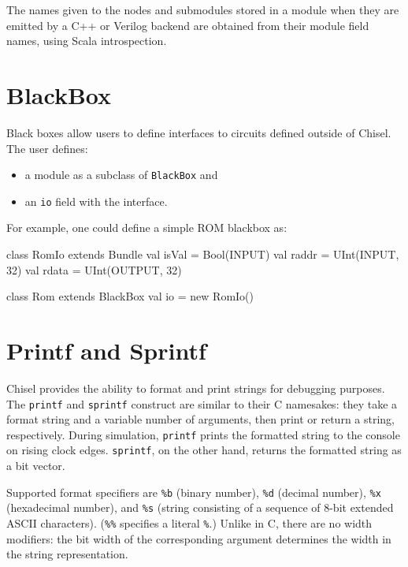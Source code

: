 \documentclass[10pt,twocolumn]{article}
\def\code#1{{\small\tt #1}}
\begin{document}
The names given to the nodes and submodules stored in a module
when they are emitted by a C++ or Verilog backend are obtained from
their module field names, using Scala introspection.


\section{BlackBox}

Black boxes allow users to define interfaces to circuits defined
outside of Chisel.  The user defines:

\begin{itemize}
\item a module as a subclass of \code{BlackBox} and
\item an \code{io} field with the interface.
\end{itemize}

\noindent
For example, one could define a simple ROM blackbox as:

\begin{scala}
class RomIo extends Bundle {
  val isVal = Bool(INPUT)
  val raddr = UInt(INPUT,  32)
  val rdata = UInt(OUTPUT, 32)
}

class Rom extends BlackBox {
  val io = new RomIo()
}
\end{scala}

\section{Printf and Sprintf}

Chisel provides the ability to format and print strings for debugging
purposes.  The \code{printf} and \code{sprintf} construct are similar to their
C namesakes: they take a format string and a variable number of arguments,
then print or return a string, respectively.  During simulation, \code{printf}
prints the formatted string to the console on rising clock edges.
\code{sprintf}, on the other hand, returns the formatted string as a bit
vector.

Supported format specifiers are \code{\%b} (binary number), \code{\%d}
(decimal number), \code{\%x} (hexadecimal number), and \code{\%s} (string
consisting of a sequence of 8-bit extended ASCII characters).  (\code{\%\%}
specifies a literal \code{\%}.) Unlike in C, there are no width modifiers: the
bit width of the corresponding argument determines the width in the string
representation.
\end{document}

